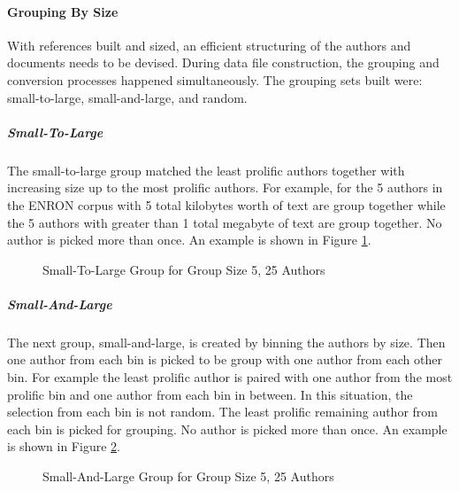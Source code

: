 	\paragraph{Grouping By Size} With references built and sized, an efficient structuring of the authors and documents needs to be devised.  During data file construction, the grouping and conversion processes happened simultaneously.  The grouping sets built were: small-to-large, small-and-large, and random.  
		\subparagraph{Small-To-Large} The small-to-large group matched the least prolific authors together with increasing size up to the most prolific authors.  For example, for the 5 authors in the ENRON corpus with 5 total kilobytes worth of text are group together while the 5 authors with greater than 1 total megabyte of text are group together.  No author is picked more than once.  An example is shown in Figure \ref{fig:smallToLargeGrouping}.
		\begin{figure}[ht!]
			\begin{center}
				\caption{Small-To-Large Group for Group Size 5, 25 Authors}
				\label{fig:smallToLargeGrouping}
			\end{center}
		\end{figure}
		\subparagraph{Small-And-Large} The next group, small-and-large, is created by binning the authors by size.  Then one author from each bin is picked to be group with one author from each other bin.  For example the least prolific author is paired with one author from the most prolific bin and one author from each bin in between.  In this situation, the selection from each bin is not random.  The least prolific remaining author from each bin is picked for grouping.  No author is picked more than once. An example is shown in Figure \ref{fig:smallAndLargeGrouping}.
		\begin{figure}[ht!]
			\begin{center}
				\caption{Small-And-Large Group for Group Size 5, 25 Authors}
				\label{fig:smallAndLargeGrouping}
			\end{center}
		\end{figure}
